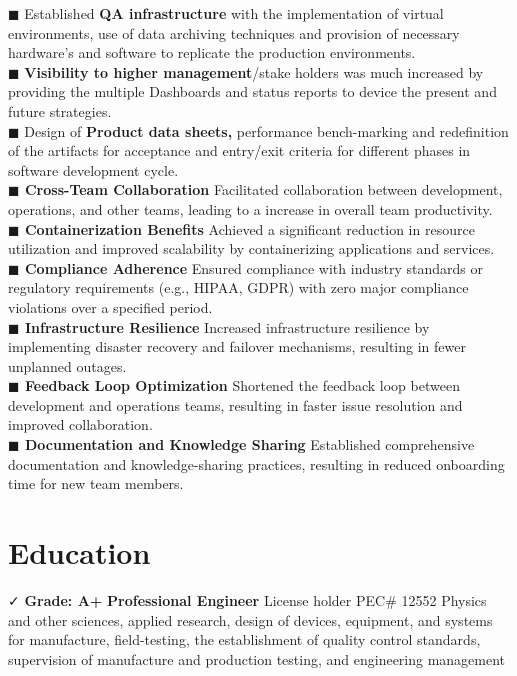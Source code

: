 \documentclass[]{cv-class}
\begin{document}
    	$\blacksquare$ Established\textbf{ QA infrastructure} with the implementation of virtual environments, use of data archiving techniques and provision of necessary hardware’s and software to replicate the production environments.\\
    	$\blacksquare$ \textbf{Visibility to higher management}/stake holders was much increased by providing the multiple Dashboards and status reports to device the present and future strategies.\\
    	$\blacksquare$ Design of \textbf{Product data sheets, }performance bench-marking and redefinition of the artifacts for acceptance and entry/exit criteria for different phases in software development cycle.\\
      \textbf{$\blacksquare$ Cross-Team Collaboration} Facilitated collaboration between development, operations, and other teams, leading to a increase in overall team productivity.\\
         \textbf{$\blacksquare$ Containerization Benefits} Achieved a significant reduction in resource utilization and improved scalability by containerizing applications and services.\\
         \textbf{$\blacksquare$ Compliance Adherence} Ensured compliance with industry standards or regulatory requirements (e.g., HIPAA, GDPR) with zero major compliance violations over a specified period.\\
    \textbf{$\blacksquare$ Infrastructure Resilience} Increased infrastructure resilience by implementing disaster recovery and failover mechanisms, resulting in fewer unplanned outages.\\
         \textbf{$\blacksquare$ Feedback Loop Optimization} Shortened the feedback loop between development and operations teams, resulting in faster issue resolution and improved collaboration.\\
         \textbf{$\blacksquare$ Documentation and Knowledge Sharing} Established comprehensive documentation and knowledge-sharing practices, resulting in reduced onboarding time for new team members.
\section{Education}
    {   {\vspace{2mm} \faCheck}  }{ \textbf{Grade: A+}\newline {\vspace{2mm} \faCheck} \textbf{Professional Engineer} License holder PEC# 12552 \newline Physics and other sciences, applied research, design of devices, equipment, and systems for manufacture, field-testing, the establishment of quality control standards, supervision of manufacture and production testing, and engineering management
}
\end{document}
